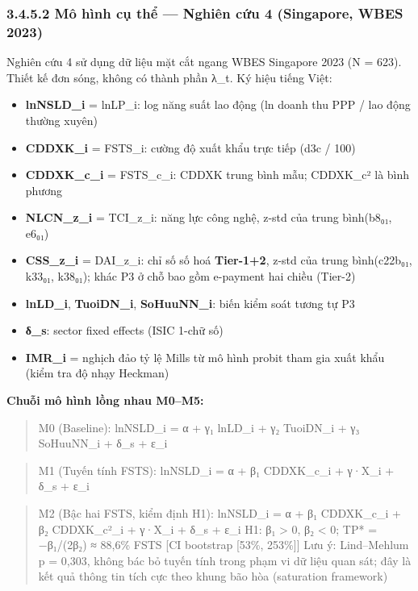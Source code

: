 \documentclass[12pt,a4paper]{article}
\providecommand{\tightlist}{\setlength{\itemsep}{0pt}\setlength{\parskip}{0pt}}
\begin{document}
\hypertarget{3452-muxf4-huxecnh-cux1ee5-thux1ec3--nghiuxean-cux1ee9u-4-singapore-wbes-2023}{%
\subsubsection{3.4.5.2 Mô hình cụ thể --- Nghiên cứu 4 (Singapore, WBES
2023)}\label{3452-muxf4-huxecnh-cux1ee5-thux1ec3--nghiuxean-cux1ee9u-4-singapore-wbes-2023}}

Nghiên cứu 4 sử dụng dữ liệu mặt cắt ngang WBES Singapore 2023 (N =
623). Thiết kế đơn sóng, không có thành phần λ\_t. Ký hiệu tiếng Việt:

\begin{itemize}
\tightlist
\item
  \textbf{lnNSLD\_i} = lnLP\_i: log năng suất lao động (ln doanh thu PPP
  / lao động thường xuyên)
\item
  \textbf{CDDXK\_i} = FSTS\_i: cường độ xuất khẩu trực tiếp (d3c / 100)
\item
  \textbf{CDDXK\_c\_i} = FSTS\_c\_i: CDDXK trung bình mẫu; CDDXK\_c² là
  bình phương
\item
  \textbf{NLCN\_z\_i} = TCI\_z\_i: năng lực công nghệ, z-std của trung
  bình(b8₀₁, e6₀₁)
\item
  \textbf{CSS\_z\_i} = DAI\_z\_i: chỉ số số hoá \textbf{Tier-1+2}, z-std
  của trung bình(c22b₀₁, k33₀₁, k38₀₁); khác P3 ở chỗ bao gồm e-payment
  hai chiều (Tier-2)
\item
  \textbf{lnLD\_i}, \textbf{TuoiDN\_i}, \textbf{SoHuuNN\_i}: biến kiểm
  soát tương tự P3
\item
  \textbf{δ\_s}: sector fixed effects (ISIC 1-chữ số)
\item
  \textbf{IMR\_i} = nghịch đảo tỷ lệ Mills từ mô hình probit tham gia
  xuất khẩu (kiểm tra độ nhạy Heckman)
\end{itemize}

\textbf{Chuỗi mô hình lồng nhau M0--M5:}

\begin{quote}
M0 (Baseline): lnNSLD\_i = α + γ₁ lnLD\_i + γ₂ TuoiDN\_i + γ₃ SoHuuNN\_i
+ δ\_s + ε\_i
\end{quote}

\begin{quote}
M1 (Tuyến tính FSTS): lnNSLD\_i = α + β₁ CDDXK\_c\_i + γ·X\_i + δ\_s +
ε\_i
\end{quote}

\begin{quote}
M2 (Bậc hai FSTS, kiểm định H1): lnNSLD\_i = α + β₁ CDDXK\_c\_i + β₂
CDDXK\_c²\_i + γ·X\_i + δ\_s + ε\_i H1: β₁ \textgreater{} 0, β₂
\textless{} 0; TP* = −β₁/(2β₂) ≈ 88,6\% FSTS {[}CI bootstrap {[}53\%,
253\%{]}{]} Lưu ý: Lind--Mehlum p = 0,303, không bác bỏ tuyến tính trong
phạm vi dữ liệu quan sát; đây là kết quả thông tin tích cực theo khung
bão hòa (saturation framework)
\end{quote}
\end{document}
